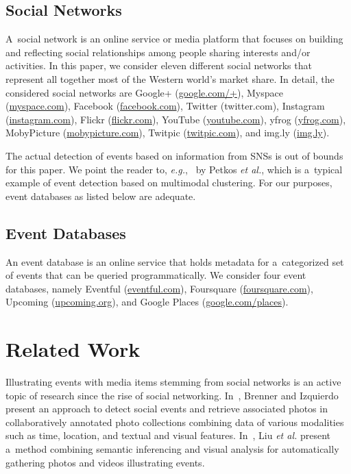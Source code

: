 \documentclass{acm_proc_article-sp}
\let\oldemph\emph
\renewcommand{\emph}[1]{\oldemph{\fontsize{9}{9}\selectfont #1}}
\begin{document}
\subsection{Social Networks} \label{sec:social-networks}
A~social network is an online service or media platform that focuses on building
and reflecting social relationships among people sharing interests and/or activities.
In this paper, we consider eleven different social networks
that represent all together most of the Western world's market share.
In detail, the considered social networks are
\mbox{Google+} (\url{google.com/+}),
Myspace (\url{myspace.com}),
Facebook (\url{facebook.com}),
Twitter ({twitter.com}),
Instagram (\url{instagram.com}),
Flickr (\url{flickr.com}),
YouTube (\url{youtube.com}),
yfrog (\url{yfrog.com}),
MobyPicture (\url{mobypicture.com}),
Twitpic (\url{twitpic.com}), and
\mbox{img.ly} (\url{img.ly}).

The actual detection of events based on information from SNSs
is out of bounds for this paper.
We point the reader to, \emph{e.g.},~\cite{Petkos2012} by Petkos \emph{et al.},
which is a~typical example of event detection based on multimodal clustering.
For our purposes, event databases as listed below are adequate.

\subsection{Event Databases}
An event database is an online service that holds metadata
for a~categorized set of events that can be queried programmatically.
We consider four event databases, namely
Eventful (\url{eventful.com}),
Foursquare (\url{foursquare.com}),
Upcoming (\url{upcoming.org}), and
Google Places (\url{google.com/places}).

\section{Related Work}
Illustrating events with media items stemming from social networks
is an active topic of research since the rise of social networking.
In~\cite{Brenner2012}, Brenner and Izquierdo present
an approach to detect social events and retrieve associated photos
in collaboratively annotated photo collections combining data of various modalities
such as time, location, and textual and visual features.
In~\cite{Liu2011}, Liu \emph{et al.} present a~method
combining semantic inferencing and visual analysis for automatically gathering
photos and videos illustrating events.
\end{document}
